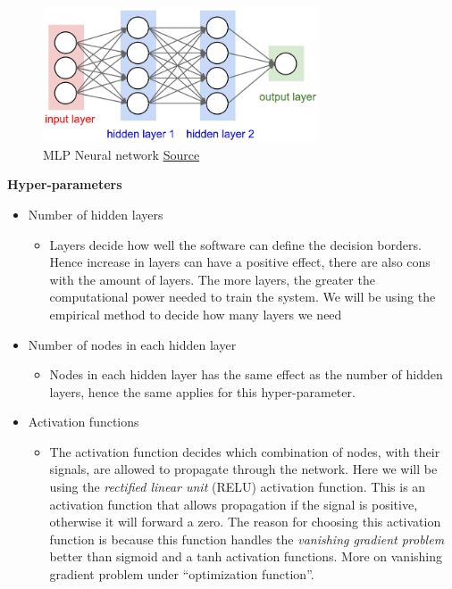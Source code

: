 \documentclass[Report.tex]{subfiles}
\begin{document}
\begin{figure}[H]
  \centering
  \includegraphics[height=4cm]{res/neural_net2.jpeg}
  \caption{MLP Neural network \href{http://cs231n.github.io/neural-networks-1/}{Source}}
  \label{fig:neural_net2}
\end{figure}


\begin{flushleft}
  \textbf{Hyper-parameters}
  \begin{itemize}
   \item{Number of hidden layers}
   \begin{itemize}
    \item{Layers decide how well the software can define the decision borders. Hence increase in layers can have a positive effect, there are also cons with the amount of layers. The more layers, the greater the computational power needed to train the system. We will be using the empirical method to decide how many layers we need}
   \end{itemize}
   \item{Number of nodes in each hidden layer}
   \begin{itemize}
    \item{Nodes in each hidden layer has the same effect as the number of hidden layers, hence the same applies for this hyper-parameter.}
   \end{itemize}
   \item{Activation functions}
   \begin{itemize}
    \item{The activation function decides which combination of nodes, with their signals, are allowed to propagate through the network. Here we will be using the \textit{rectified linear unit} (RELU) activation function. This is an activation function that allows propagation if the signal is positive, otherwise it will forward a zero. The reason for choosing this activation function is because this function handles the \textit{vanishing gradient problem} better than sigmoid and a tanh activation functions. More on vanishing gradient problem under ``optimization function''.}
   \end{itemize}

\end{itemize}
\end{flushleft}
\end{document}
